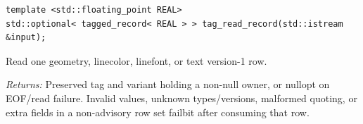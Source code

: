 \par\noindent\begin{minipage}{\linewidth}
\begin{lstlisting}[style=apireference]
template <std::floating_point REAL>
std::optional< tagged_record< REAL > > tag_read_record(std::istream &input);
\end{lstlisting}
{\footnotesize Read one geometry, linecolor, linefont, or text version-1 row.\par}
{\footnotesize\textit{Returns:} Preserved tag and variant holding a non-null owner, or nullopt on EOF/read failure. Invalid values, unknown types/versions, malformed quoting, or extra fields in a non-advisory row set failbit after consuming that row.\par}
\end{minipage}\par\vspace{1pt}
